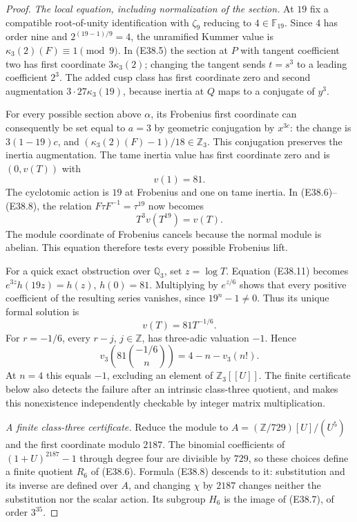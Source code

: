 \begin{proof}
\emph{The local equation, including normalization of the section.}
At $19$ fix a compatible root-of-unity identification
with $\zeta_9$ reducing to $4\in\mathbb F_{19}$.
Since $4$ has order nine and $2^{(19-1)/9}=4$, the
unramified Kummer value is
$\kappa_3(2)(F)\equiv1\pmod9$.
In (E38.5) the section at $P$ with tangent coefficient
two has first coordinate $3\kappa_3(2)$; changing the
tangent sends $t=s^3$ to a leading coefficient $2^3$.
The added cusp class has first coordinate zero and
second augmentation $3\cdot27\kappa_3(19)$, because
inertia at $Q$ maps to a conjugate of $y^3$.

For every possible section above $\alpha$, its
Frobenius first coordinate can consequently be set
equal to $a=3$ by geometric conjugation by $x^{3c}$:
the change is $3(1-19)c$, and
$(\kappa_3(2)(F)-1)/18\in\mathbb Z_3$.
This conjugation preserves the inertia augmentation.
The tame inertia value has first coordinate zero and
is $(0,v(T))$ with
\[
 v(1)=81.
 \tag{E38.10}
\]
The cyclotomic action is $19$ at Frobenius and one
on tame inertia. In (E38.6)--(E38.8), the relation
$F\tau F^{-1}=\tau^{19}$ now becomes
\[
 T^3v(T^{19})=v(T).
 \tag{E38.11}
\]
The module coordinate of Frobenius cancels because
the normal module is abelian. This equation therefore
tests every possible Frobenius lift.

For a quick exact obstruction over $\mathbb Q_3$, set
$z=\log T$. Equation (E38.11) becomes
$e^{3z}h(19z)=h(z)$, $h(0)=81$.
Multiplying by $e^{z/6}$ shows that every positive
coefficient of the resulting series vanishes, since
$19^n-1\ne0$. Thus its unique formal solution is
\[
 v(T)=81T^{-1/6}.
 \tag{E38.12}
\]
For $r=-1/6$, every $r-j$, $j\in\mathbb Z$, has
three-adic valuation $-1$. Hence
\[
 v_3\!\left(81\binom{-1/6}{n}\right)
     =4-n-v_3(n!).
\]
At $n=4$ this equals $-1$, excluding an element of
$\mathbb Z_3[[U]]$. The finite certificate below also
detects the failure after an intrinsic class-three
quotient, and makes this nonexistence independently
checkable by integer matrix multiplication.

\emph{A finite class-three certificate.}
Reduce the module to
$A=(\mathbb Z/729)[U]/(U^5)$ and the first coordinate
modulo $2187$. The binomial coefficients of
$(1+U)^{2187}-1$ through degree four are divisible by
$729$, so these choices define a finite quotient
$R_6$ of (E38.6). Formula (E38.8) descends to it:
substitution and its inverse are defined over $A$,
and changing $\chi$ by $2187$ changes neither the
substitution nor the scalar action.
Its subgroup $H_6$ is the image of (E38.7), of order
$3^{35}$.


\end{proof}
